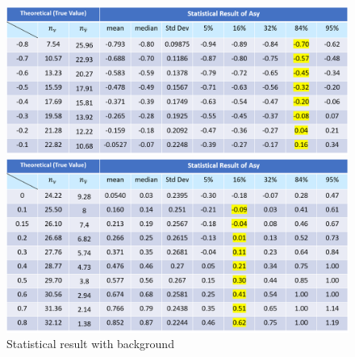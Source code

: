 \documentclass[a4paper,12pt]{article}
\begin{document}
\newpage
\begin{figure}[H]
\begin{minipage}[t]{0.25\linewidth}
\centering
\includegraphics[width=5.5in]{Images/table_bkg_1.png}
\end{minipage}%

\begin{minipage}[t]{0.25\linewidth}
\centering
\includegraphics[width=5.5in]{Images/table_bkg_2.png}
\end{minipage}%
\caption{ Statistical result with background}
\label{table_BKG}
\end{figure}
\end{document}
